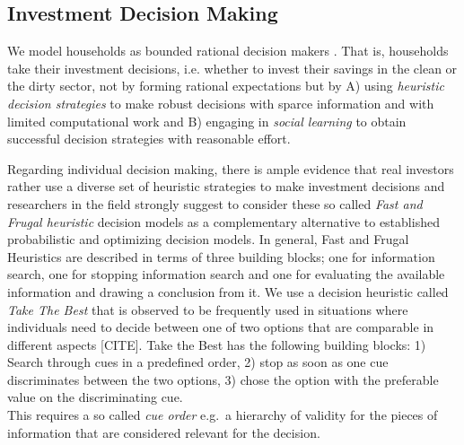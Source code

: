 \subsection{Investment Decision Making}
We model households as bounded rational decision makers \cite{simon1972theories, simon1982models, gigerenzer2002bounded}.
That is, households take their investment decisions, i.e. whether to invest their savings in the clean or the dirty sector, not by forming rational expectations \cite{Evans2006, Kirman2014} but by A) using \emph{heuristic decision strategies} to make robust decisions with sparce information and with limited computational work and B) engaging in \emph{social learning} \cite{bandura1977} to obtain successful decision strategies \cite{Traulsen2010} with reasonable effort.

Regarding individual decision making, there is ample evidence that real investors rather use a diverse set of heuristic strategies to make investment decisions \cite{Gigerenzer2018} and researchers in the field strongly suggest to consider these so called \emph{Fast and Frugal heuristic} decision models as a complementary alternative to established probabilistic and optimizing decision models. 
In general, Fast and Frugal Heuristics are described in terms of three building blocks; one for information search, one for stopping information search and one for evaluating the available information and drawing a conclusion from it.
We use a decision heuristic called \emph{Take The Best} that is observed to be frequently used in situations where individuals need to decide between one of two options that are comparable in different aspects [CITE]. 
Take the Best has the following building blocks: 1) Search through cues in a predefined order, 2) stop as soon as one cue discriminates between the two options, 3) chose the option with the preferable value on the discriminating cue. \\
This requires a so called \textit{cue order} e.g.\ a hierarchy of validity for the pieces of information that are considered relevant for the decision. \\

